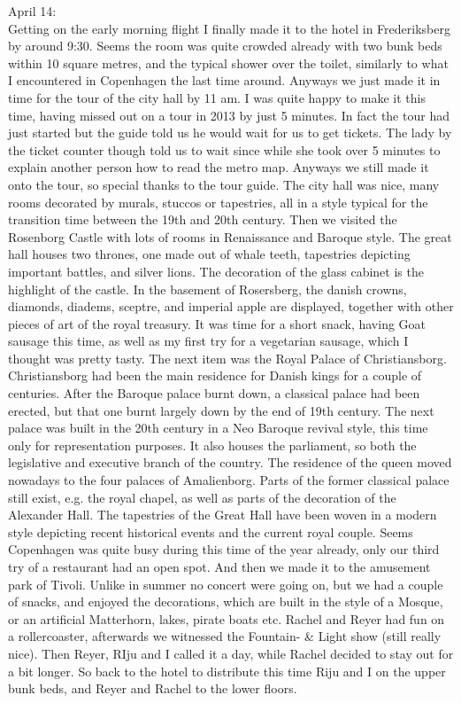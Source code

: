 April 14:\\
Getting on the early morning flight I finally made it to the hotel in Frederiksberg by around 9:30. Seems the room was quite crowded already with two bunk beds within 10 square metres, and the typical shower over the toilet, similarly to what I encountered in Copenhagen the last time around. Anyways we just made it in time for the tour of the city hall by 11 am. I was quite happy to make it this time, having missed out on a tour in 2013 by just 5 minutes. In fact the tour had just started but the guide told us he would wait for us to get tickets. The lady by the ticket counter though told us to wait since while she took over 5 minutes to explain another person how to read the metro map. Anyways we still made it onto the tour, so special thanks to the tour guide. The city hall was nice, many rooms decorated by murals, stuccos or tapestries, all in a style typical for the transition time between the 19th and 20th century. Then we visited the Rosenborg Castle with lots of rooms in Renaissance and Baroque style. The great hall houses two thrones, one made out of whale teeth, tapestries depicting important battles, and silver lions. The decoration of the glass cabinet is the highlight of the castle. In the basement of Rosersberg, the danish crowns, diamonds, diadems, sceptre, and imperial apple are displayed, together with other pieces of art of the royal treasury. It was time for a short snack, having Goat sausage this time, as well as my first try for a vegetarian sausage, which I thought was pretty tasty. The next item was the Royal Palace of Christiansborg. Christiansborg had been the main residence for Danish kings for a couple of centuries. After the Baroque palace burnt down, a classical palace had been erected, but that one burnt largely down by the end of 19th century. The next palace was built in the 20th century in a Neo Baroque revival style, this time only for representation purposes. It also houses the parliament, so both the legislative and executive branch of the country. The residence of the queen moved nowadays to the four palaces of Amalienborg. Parts of the former classical palace still exist, e.g. the royal chapel, as well as parts of the decoration of the Alexander Hall. The tapestries of the Great Hall have been woven in a modern style depicting recent historical events and the current royal couple. Seems Copenhagen was quite busy during this time of the year already, only our third try of a restaurant had an open spot. And then we made it to the amusement park of Tivoli. Unlike in summer no concert were going on, but we had a couple of snacks, and enjoyed the decorations, which are built in the style of a Mosque, or an artificial Matterhorn, lakes, pirate boats etc. Rachel and Reyer had fun on a rollercoaster, afterwards we witnessed the Fountain- \& Light show (still really nice). Then Reyer, RIju and I called it a day, while Rachel decided to stay out for a bit longer. So back to the hotel to distribute this time Riju and I on the upper bunk beds, and Reyer and Rachel to the lower floors.\\


